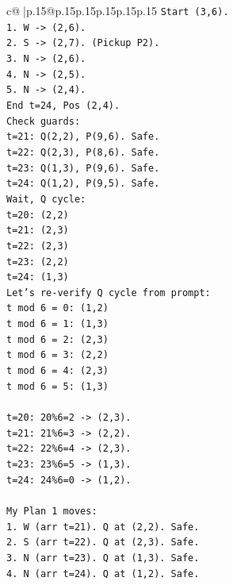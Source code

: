 \documentclass{article}
\begin{document}
{\begin{supertabular}{c@{$\;$}|p{.15\linewidth}@{}p{.15\linewidth}p{.15\linewidth}p{.15\linewidth}p{.15\linewidth}p{.15\linewidth}}
{{{\texttt{Start (3,6).} \\
\texttt{1. W {-}> (2,6).} \\
\texttt{2. S {-}> (2,7). (Pickup P2).} \\
\texttt{3. N {-}> (2,6).} \\
\texttt{4. N {-}> (2,5).} \\
\texttt{5. N {-}> (2,4).} \\
\texttt{End t=24, Pos (2,4).} \\
\texttt{Check guards:} \\
\texttt{t=21: Q(2,2), P(9,6). Safe.} \\
\texttt{t=22: Q(2,3), P(8,6). Safe.} \\
\texttt{t=23: Q(1,3), P(9,6). Safe.} \\
\texttt{t=24: Q(1,2), P(9,5). Safe.} \\
\texttt{Wait, Q cycle:} \\
\texttt{t=20: (2,2)} \\
\texttt{t=21: (2,3)} \\
\texttt{t=22: (2,3)} \\
\texttt{t=23: (2,2)} \\
\texttt{t=24: (1,3)} \\
\texttt{Let's re{-}verify Q cycle from prompt:} \\
\texttt{t mod 6 = 0: (1,2)} \\
\texttt{t mod 6 = 1: (1,3)} \\
\texttt{t mod 6 = 2: (2,3)} \\
\texttt{t mod 6 = 3: (2,2)} \\
\texttt{t mod 6 = 4: (2,3)} \\
\texttt{t mod 6 = 5: (1,3)} \\
\\ 
\texttt{t=20: 20\%6=2 {-}> (2,3).} \\
\texttt{t=21: 21\%6=3 {-}> (2,2).} \\
\texttt{t=22: 22\%6=4 {-}> (2,3).} \\
\texttt{t=23: 23\%6=5 {-}> (1,3).} \\
\texttt{t=24: 24\%6=0 {-}> (1,2).} \\
\\ 
\texttt{My Plan 1 moves:} \\
\texttt{1. W (arr t=21). Q at (2,2). Safe.} \\
\texttt{2. S (arr t=22). Q at (2,3). Safe.} \\
\texttt{3. N (arr t=23). Q at (1,3). Safe.} \\
\texttt{4. N (arr t=24). Q at (1,2). Safe.} \\
}}}
\end{supertabular}}
\end{document}
